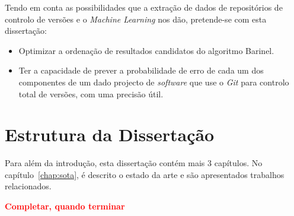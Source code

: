 Tendo em conta as possibilidades que a extração de dados de repositórios de controlo de versões e o \emph{Machine Learning} nos dão, pretende-se com esta dissertação:

\begin{itemize}
\item Optimizar a ordenação de resultados candidatos do algoritmo Barinel.
\item Ter a capacidade de prever a probabilidade de erro de cada um dos componentes de um dado projecto de \emph{software} que use o \emph{Git} para controlo total de versões, com uma precisão útil.
\end{itemize}

\section{Estrutura da Dissertação} \label{sec:struct}

Para além da introdução, esta dissertação contém mais 3 capítulos.
No capítulo~\ref{chap:sota}, é descrito o estado da arte e são
apresentados trabalhos relacionados. 

\textbf{\textcolor{red}{Completar, quando terminar} }
